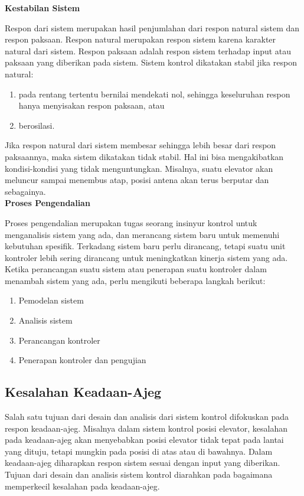 \noindent \textbf{Kestabilan Sistem}

Respon dari sistem merupakan hasil penjumlahan dari respon natural sistem dan respon paksaan. Respon natural merupakan respon sistem karena karakter natural dari sistem. Respon paksaan adalah respon sistem terhadap input atau paksaan yang diberikan pada sistem.
Sistem kontrol dikatakan stabil jika respon natural:
\begin{enumerate}
	\item pada rentang tertentu bernilai mendekati nol, sehingga keseluruhan respon hanya menyisakan respon paksaan, atau
	\item berosilasi.
\end{enumerate}

Jika respon natural dari sistem membesar sehingga lebih besar dari respon paksaannya, maka sistem dikatakan tidak stabil. Hal ini bisa mengakibatkan kondisi-kondisi yang tidak menguntungkan. Misalnya, suatu elevator akan meluncur sampai menembus atap, posisi antena akan terus berputar dan sebagainya.\\

\noindent\textbf{Proses Pengendalian}

Proses pengendalian merupakan tugas seorang insinyur kontrol untuk menganalisis sistem yang ada, dan merancang sistem baru untuk memenuhi kebutuhan spesifik. Terkadang sistem baru perlu dirancang, tetapi suatu unit kontroler lebih sering dirancang untuk meningkatkan kinerja sistem yang ada. Ketika perancangan suatu sistem atau penerapan suatu kontroler dalam menambah sistem yang ada, perlu mengikuti beberapa langkah berikut: \cite{ControlSystemBook}
\begin{enumerate}
	\item Pemodelan sistem
	\item Analisis sistem
	\item Perancangan kontroler
	\item Penerapan kontroler dan pengujian
\end{enumerate}

\subsection{Kesalahan Keadaan-Ajeg}

Salah satu tujuan dari desain dan analisis dari sistem kontrol difokuskan pada respon keadaan-ajeg. Misalnya dalam sistem kontrol posisi elevator, kesalahan pada keadaan-ajeg akan menyebabkan posisi elevator tidak tepat pada lantai yang dituju, tetapi mungkin pada posisi di atas atau di bawahnya. Dalam keadaan-ajeg diharapkan respon sistem sesuai dengan input yang diberikan. Tujuan dari desain dan analisis sistem kontrol diarahkan pada bagaimana memperkecil kesalahan pada keadaan-ajeg.

